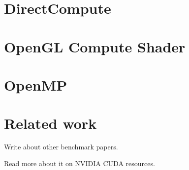 \section{DirectCompute}

\section{OpenGL Compute Shader}

\section{OpenMP}

\section{Related work}

Write about other benchmark papers.

Read more about it on NVIDIA CUDA resources.